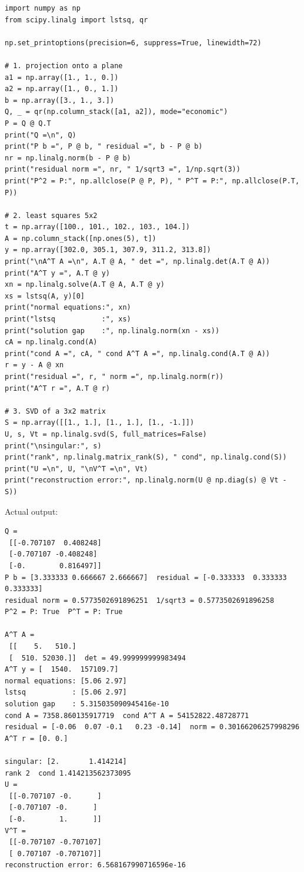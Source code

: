 \begin{lab}
\begin{verbatim}
import numpy as np
from scipy.linalg import lstsq, qr

np.set_printoptions(precision=6, suppress=True, linewidth=72)

# 1. projection onto a plane
a1 = np.array([1., 1., 0.])
a2 = np.array([1., 0., 1.])
b = np.array([3., 1., 3.])
Q, _ = qr(np.column_stack([a1, a2]), mode="economic")
P = Q @ Q.T
print("Q =\n", Q)
print("P b =", P @ b, " residual =", b - P @ b)
nr = np.linalg.norm(b - P @ b)
print("residual norm =", nr, " 1/sqrt3 =", 1/np.sqrt(3))
print("P^2 = P:", np.allclose(P @ P, P), " P^T = P:", np.allclose(P.T, P))

# 2. least squares 5x2
t = np.array([100., 101., 102., 103., 104.])
A = np.column_stack([np.ones(5), t])
y = np.array([302.0, 305.1, 307.9, 311.2, 313.8])
print("\nA^T A =\n", A.T @ A, " det =", np.linalg.det(A.T @ A))
print("A^T y =", A.T @ y)
xn = np.linalg.solve(A.T @ A, A.T @ y)
xs = lstsq(A, y)[0]
print("normal equations:", xn)
print("lstsq           :", xs)
print("solution gap    :", np.linalg.norm(xn - xs))
cA = np.linalg.cond(A)
print("cond A =", cA, " cond A^T A =", np.linalg.cond(A.T @ A))
r = y - A @ xn
print("residual =", r, " norm =", np.linalg.norm(r))
print("A^T r =", A.T @ r)

# 3. SVD of a 3x2 matrix
S = np.array([[1., 1.], [1., 1.], [1., -1.]])
U, s, Vt = np.linalg.svd(S, full_matrices=False)
print("\nsingular:", s)
print("rank", np.linalg.matrix_rank(S), " cond", np.linalg.cond(S))
print("U =\n", U, "\nV^T =\n", Vt)
print("reconstruction error:", np.linalg.norm(U @ np.diag(s) @ Vt - S))
\end{verbatim}
Actual output:
\begin{verbatim}
Q =
 [[-0.707107  0.408248]
 [-0.707107 -0.408248]
 [-0.        0.816497]]
P b = [3.333333 0.666667 2.666667]  residual = [-0.333333  0.333333  0.333333]
residual norm = 0.5773502691896251  1/sqrt3 = 0.5773502691896258
P^2 = P: True  P^T = P: True

A^T A =
 [[    5.   510.]
 [  510. 52030.]]  det = 49.999999999983494
A^T y = [  1540.  157109.7]
normal equations: [5.06 2.97]
lstsq           : [5.06 2.97]
solution gap    : 5.315035090945416e-10
cond A = 7358.860135917719  cond A^T A = 54152822.48728771
residual = [-0.06  0.07 -0.1   0.23 -0.14]  norm = 0.30166206257998296
A^T r = [0. 0.]

singular: [2.       1.414214]
rank 2  cond 1.414213562373095
U =
 [[-0.707107 -0.      ]
 [-0.707107 -0.      ]
 [-0.        1.      ]] 
V^T =
 [[-0.707107 -0.707107]
 [ 0.707107 -0.707107]]
reconstruction error: 6.568167990716596e-16
\end{verbatim}
\end{lab}

